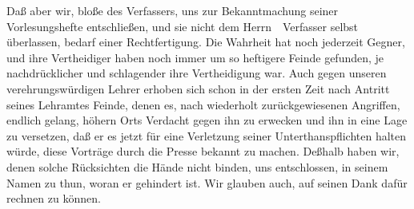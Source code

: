 Daß aber wir, bloße  des Verfassers, uns zur Bekanntmachung seiner Vorlesungshefte entschließen, und sie nicht dem Herrn~\ Verfasser selbst überlassen, bedarf einer Rechtfertigung. Die Wahrheit hat noch jederzeit Gegner, und ihre Vertheidiger haben noch immer um so heftigere Feinde gefunden, je nachdrücklicher und schlagender ihre Vertheidigung war. Auch gegen unseren verehrungswürdigen Lehrer erhoben sich schon in der ersten Zeit nach Antritt seines Lehramtes Feinde, denen es, nach wiederholt zurückgewiesenen Angriffen, endlich gelang, höhern Orts Verdacht gegen ihn zu erwecken und ihn in eine Lage zu versetzen, daß er es jetzt für eine Verletzung seiner Unterthanspflichten halten würde, diese Vorträge durch die Presse bekannt zu machen. Deßhalb haben wir, denen solche Rücksichten die Hände nicht binden, uns entschlossen, in seinem Namen zu thun, woran er gehindert ist. Wir glauben auch, auf seinen Dank dafür rechnen zu können.\par
